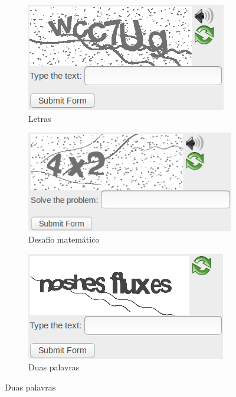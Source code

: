 \begin{figure}[ht]
	\begin{subfigure}{.5\textwidth}
		\centering
		\includegraphics[width=.9\linewidth]{figuras/captcha_letras.png}
		\caption{Letras}
	\end{subfigure}
	\begin{subfigure}{.5\textwidth}
		\centering
		\includegraphics[width=.9\linewidth]{figuras/captcha_mat.png}
		\caption{Desafio matemático}
	\end{subfigure}%
	\vspace{.05\linewidth}
	\begin{subfigure}{.5\textwidth}
		\centering
		\includegraphics[width=.9\linewidth]{figuras/captcha_texto.png}
		\caption{Duas palavras}

\end{subfigure}
\end{figure}
